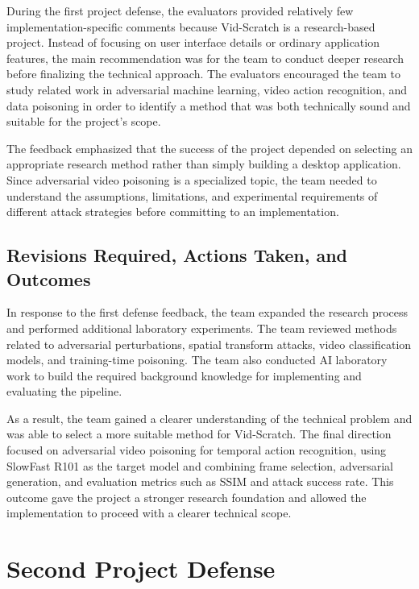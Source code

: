 During the first project defense, the evaluators provided relatively
few implementation-specific comments because Vid-Scratch is a
research-based project. Instead of focusing on user interface details
or ordinary application features, the main recommendation was for the
team to conduct deeper research before finalizing the technical
approach. The evaluators encouraged the team to study related work in
adversarial machine learning, video action recognition, and data
poisoning in order to identify a method that was both technically
sound and suitable for the project's scope.

The feedback emphasized that the success of the project depended on
selecting an appropriate research method rather than simply building a
desktop application. Since adversarial video poisoning is a specialized
topic, the team needed to understand the assumptions, limitations, and
experimental requirements of different attack strategies before
committing to an implementation.

\subsection{Revisions Required, Actions Taken, and Outcomes}
\label{subsection:first-defense-revisions}

In response to the first defense feedback, the team expanded the
research process and performed additional laboratory experiments. The
team reviewed methods related to adversarial perturbations, spatial
transform attacks, video classification models, and training-time
poisoning. The team also conducted AI laboratory work to build the
required background knowledge for implementing and evaluating the
pipeline.

As a result, the team gained a clearer understanding of the technical
problem and was able to select a more suitable method for Vid-Scratch.
The final direction focused on adversarial video poisoning for
temporal action recognition, using SlowFast R101 as the target model
and combining frame selection, adversarial generation, and evaluation
metrics such as SSIM and attack success rate. This outcome gave the
project a stronger research foundation and allowed the implementation
to proceed with a clearer technical scope.

\vspace{1.2\baselineskip}
\section{Second Project Defense}
\label{section:second-defense}

